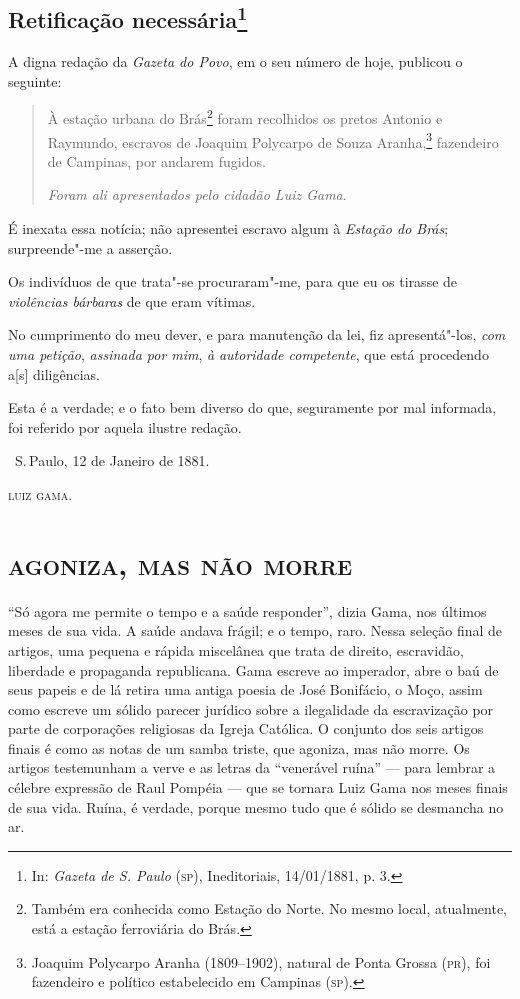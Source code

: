 \chapter{Retificação necessária\footnote[*]{In: \emph{Gazeta de S.
  Paulo} (\textsc{sp}), Ineditoriais, 14/01/1881, p. 3.}}


A digna redação da \emph{Gazeta do Povo}, em o seu número de hoje,
publicou o seguinte:

\begin{quote}
À estação urbana do Brás\footnote{Também era conhecida como Estação
  do Norte. No mesmo local, atualmente, está a estação ferroviária do
  Brás.} foram recolhidos os pretos Antonio e Raymundo, escravos de
Joaquim Polycarpo de Souza Aranha,\footnote{Joaquim Polycarpo Aranha
  (1809--1902), natural de Ponta Grossa (\textsc{pr}), foi fazendeiro e político
  estabelecido em Campinas (\textsc{sp}).}
fazendeiro de Campinas, por
andarem fugidos.

\emph{Foram ali apresentados pelo cidadão Luiz Gama}.
\end{quote}

É inexata essa notícia; não apresentei escravo algum à \emph{Estação do
Brás}; surpreende"-me a asserção.

Os indivíduos de que trata"-se procuraram"-me, para que eu os tirasse de
\emph{violências bárbaras} de que eram vítimas.

No cumprimento do meu dever, e para manutenção da lei, fiz
apresentá"-los, \emph{com uma petição}, \emph{assinada por mim}, \emph{à}
\emph{autoridade competente}, que está procedendo a{[}s{]} diligências.

Esta é a verdade; e o fato bem diverso do que, seguramente por mal
informada, foi referido por aquela ilustre redação.

\bigskip

\hfill\ S.\,Paulo, 12 de Janeiro de 1881.

\hfill\textsc{luiz gama.}

\paginabranca
\begingroup\makeatletter\@openrightfalse
\part{\textsc{agoniza, mas não morre}}

\mbox{}\vfill
\thispagestyle{empty}

{\small\noindent
``Só agora me permite o tempo e a saúde responder'', dizia Gama, nos
últimos meses de sua vida. A saúde andava frágil; e o tempo, raro. Nessa
seleção final de artigos, uma pequena e rápida miscelânea que trata de
direito, escravidão, liberdade e propaganda republicana. Gama escreve ao
imperador, abre o baú de seus papeis e de lá retira uma antiga poesia de
José Bonifácio, o Moço, assim como escreve um sólido parecer jurídico
sobre a ilegalidade da escravização por parte de corporações religiosas
da Igreja Católica. O conjunto dos seis artigos finais é como as notas
de um samba triste, que agoniza, mas não morre. Os artigos testemunham a
verve e as letras da ``venerável ruína'' --- para lembrar a célebre
expressão de Raul Pompéia --- que se tornara Luiz Gama nos meses finais
de sua vida. Ruína, é verdade, porque mesmo tudo que é sólido se
desmancha no ar.}
\@openrighttrue\makeatother\endgroup

